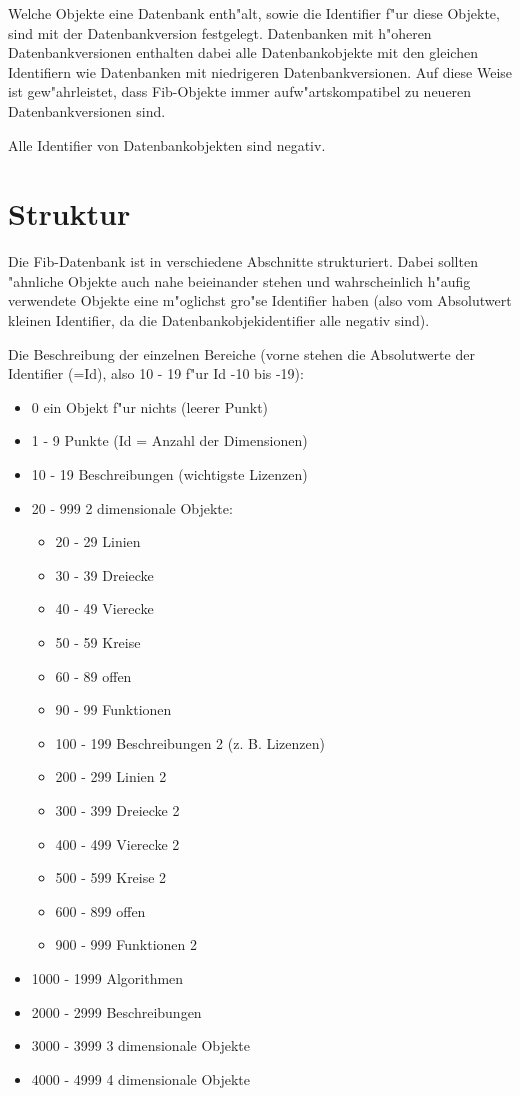 Welche Objekte eine Datenbank enth"alt, sowie die Identifier f"ur diese Objekte, sind mit der Datenbankversion festgelegt. Datenbanken mit h"oheren Datenbankversionen enthalten dabei alle Datenbankobjekte mit den gleichen Identifiern wie Datenbanken mit niedrigeren Datenbankversionen. Auf diese Weise ist gew"ahrleistet, dass Fib-Objekte immer aufw"artskompatibel zu neueren Datenbankversionen sind.

Alle Identifier von Datenbankobjekten sind negativ.


\section{Struktur}

Die Fib-Datenbank ist in verschiedene Abschnitte strukturiert.
Dabei sollten "ahnliche Objekte auch nahe beieinander stehen und wahrscheinlich h"aufig verwendete Objekte eine m"oglichst gro"se Identifier haben (also vom Absolutwert kleinen Identifier, da die Datenbankobjekidentifier alle negativ sind).

\bigskip\noindent
Die Beschreibung der einzelnen Bereiche (vorne stehen die Absolutwerte der Identifier (=Id), also 10 - 19 f"ur Id -10 bis -19):
\begin{itemize}
 \item 0 ein Objekt f"ur nichts (leerer Punkt)
 \item 1 - 9 Punkte (Id = Anzahl der Dimensionen)
 \item 10 - 19 Beschreibungen (wichtigste Lizenzen)
 \item 20 - 999 2 dimensionale Objekte:
 \begin{itemize}
  \item 20 - 29 Linien
  \item 30 - 39 Dreiecke
  \item 40 - 49 Vierecke
  \item 50 - 59 Kreise
  \item 60 - 89 offen
  \item 90 - 99 Funktionen
  \item 100 - 199 Beschreibungen 2 (z. B. Lizenzen)
  \item 200 - 299 Linien 2
  \item 300 - 399 Dreiecke 2
  \item 400 - 499 Vierecke 2
  \item 500 - 599 Kreise 2
  \item 600 - 899 offen
  \item 900 - 999 Funktionen 2
 \end{itemize}
 \item 1000 - 1999 Algorithmen
 \item 2000 - 2999 Beschreibungen
 \item 3000 - 3999 3 dimensionale Objekte
 \item 4000 - 4999 4 dimensionale Objekte

\end{itemize}


